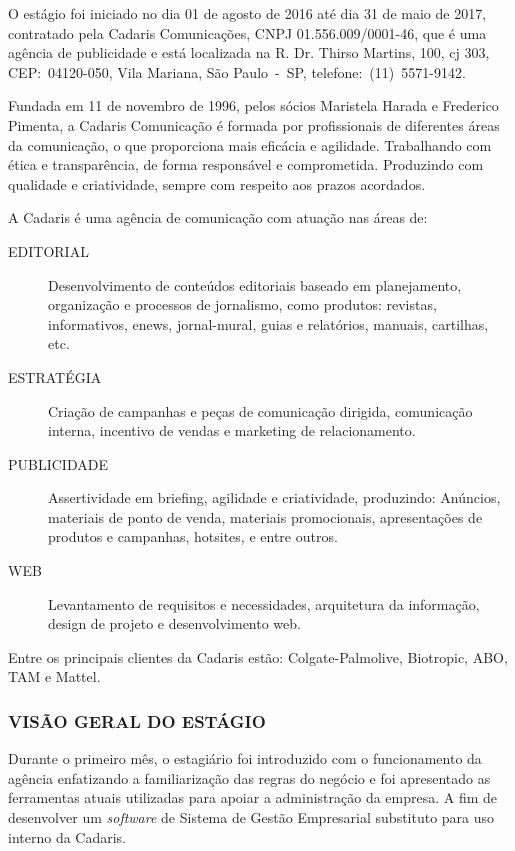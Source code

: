 \documentclass[
  12pt,				%
  openany,
  oneside,
  a4paper,			%
  english,			%
  brazil
]{article}
\numberwithin{figure}{section}
\numberwithin{table}{section}
\begin{document}
O estágio foi iniciado no dia 01 de agosto de 2016 até dia 31 de maio de 2017, contratado pela Cadaris Comunicações, CNPJ 01.556.009/0001-46, que é uma agência de publicidade e está localizada na R. Dr. Thirso Martins, 100, cj 303, CEP:~04120-050, Vila Mariana, São Paulo~-~SP, telefone:~(11)~5571-9142.

Fundada em 11 de novembro de 1996, pelos sócios Maristela Harada e Frederico Pimenta, a Cadaris Comunicação é formada por profissionais de diferentes áreas da comunicação, o que proporciona mais eficácia e agilidade. Trabalhando com ética e transparência, de forma responsável e comprometida. Produzindo com qualidade e criatividade, sempre com respeito aos prazos acordados.

A Cadaris é uma agência de comunicação com atuação nas áreas de:
\vspace{-0.5cm}

\begin{description}
   \item [EDITORIAL] Desenvolvimento de conteúdos editoriais baseado em planejamento, organização e processos de jornalismo, como produtos: revistas, informativos, enews, jornal-mural, guias e relatórios, manuais, cartilhas, etc.
   \item [ESTRATÉGIA] Criação de campanhas e peças de comunicação dirigida, comunicação interna, incentivo de vendas e marketing de relacionamento.
   \item [PUBLICIDADE]  Assertividade em briefing, agilidade e criatividade, produzindo: Anúncios, materiais de ponto de venda, materiais promocionais, apresentações de produtos e campanhas, hotsites, e entre outros.
   \item [WEB] Levantamento de requisitos e necessidades, arquitetura da informação, design de projeto e desenvolvimento web.
\end{description}

Entre os principais clientes da Cadaris estão: Colgate-Palmolive, Biotropic, ABO, TAM e Mattel.


\subsubsection{VISÃO GERAL DO ESTÁGIO}

Durante o primeiro mês, o estagiário foi introduzido com o funcionamento da agência enfatizando a familiarização das regras do negócio e foi apresentado as ferramentas atuais utilizadas para apoiar a administração da empresa. A fim de desenvolver um \textit{software} de Sistema de Gestão Empresarial substituto para uso interno da Cadaris. 
\end{document}

